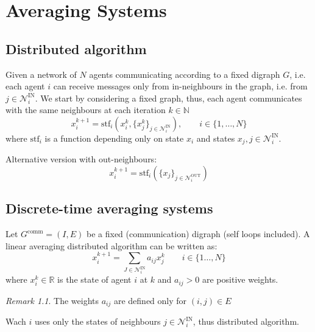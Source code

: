 \documentclass{book}
\newcommand{\R}{\mathbb{R}}
\newcommand{\N}{\mathbb{N}}
\theoremstyle{definition}
\theoremstyle{remark}
\newtheorem*{remark}{Remark}
\theoremstyle{remark}
\theoremstyle{definition}
\begin{document}
\chapter{Averaging Systems}
\section{Distributed algorithm}
Given a network of $N$ agents communicating according to a fixed digraph $G$, i.e. each agent $i$ can receive messages only from in-neighbours in the graph, i.e. from $j\in\mathcal{N}_i^{\text{IN}}$. 
We start by considering a fixed graph, thus, each agent communicates with the same neighbours at each iteration $k\in\N$
\[
    x_i^{k+1}=\text{stf}_i(x_i^k,\{x_j^k\}_{j\in\mathcal{N}_i^{\text{IN}}}), \qquad i\in\{1,\dots,N\}
\]
where $\text{stf}_i$ is a function depending only on state $x_i$ and states $x_j,j\in\mathcal{N}_i^{\text{IN}}$.

Alternative version with out-neighbours:
\[
    x_i^{k+1}=\text{stf}_i(\{x_j\}_{j\in\mathcal{N}_i^{\text{OUT}}})
\]
\section{Discrete-time averaging systems}
Let $G^{\text{comm}}=(I,E)$ be a fixed (communication) digraph (self loops included). A linear averaging distributed algorithm can be written as:
\[
    x_i^{k+1}=\displaystyle\sum_{J\in\mathcal{N}_i^{\text{IN}}}a_{ij}x_j^k \qquad i\in\{1\dots,N\}
\]
where $x_i^k\in\R$ is the state of agent $i$ at $k$ and $a_{ij}>0$ are positive weights. 
\begin{remark}
    The weights $a_{ij}$ are defined only for $(i,j)\in E$
\end{remark}
Wach $i$ uses only the states of neighbours $j\in\mathcal{N}_i^{\text{IN}}$, thus distributed algorithm.
\end{document}
